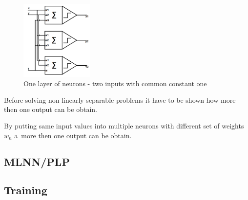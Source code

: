 \begin{figure}
    \includegraphics[width=0.32\textwidth]{Media/Layer.png}
    \caption[One layer of neurons]{One layer of neurons - two inputs with common constant one}
    \label{fig:OneNeuronsLayer}
\end{figure}

Before solving non linearly separable problems it have to be shown how more then one output can be obtain.

By putting same input values into multiple neurons with different set of weights $w_n$ a~more then one output can be obtain. 

\subsection{MLNN/PLP}

\subsection{Training}